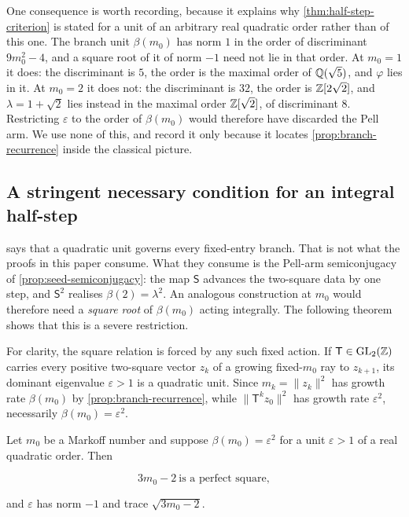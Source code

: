\begin{remark}
One consequence is worth recording, because it explains why
\cref{thm:half-step-criterion} is stated for a unit of an arbitrary real
quadratic order rather than of this one. The branch unit $\beta(m_0)$ has norm
$1$ in the order of discriminant $9m_0^2-4$, and a square root of it of norm
$-1$ need not lie in that order. At $m_0=1$ it does: the discriminant is $5$,
the order is the maximal order of $\mathbb{Q}(\sqrt5)$, and $\varphi$ lies in it. At
$m_0=2$ it does not: the discriminant is $32$, the order is $\mathbb{Z}[2\sqrt2]$, and
$\lambda=1+\sqrt2$ lies instead in the maximal order $\mathbb{Z}[\sqrt2]$, of
discriminant $8$. Restricting $\varepsilon$ to the order of $\beta(m_0)$ would
therefore have discarded the Pell arm. We use none of this, and record it only
because it locates \cref{prop:branch-recurrence} inside the classical
picture.
\end{remark}

\subsection{A stringent necessary condition for an integral half-step}

 says that a quadratic unit governs every
fixed-entry branch. That is not what the proofs in this paper consume. What
they consume is the Pell-arm semiconjugacy of
\cref{prop:seed-semiconjugacy}: the map $\mathsf S$ advances the two-square
data by one step, and $\mathsf S^2$ realises
$\beta(2)=\lambda^2$. An analogous construction at $m_0$ would therefore
need a \emph{square root} of $\beta(m_0)$ acting integrally. The following
theorem shows that this is a severe restriction.

For clarity, the square relation is forced by any such fixed action. If
$\mathsf T\in\mathrm{GL}_2(\mathbb{Z})$ carries every positive two-square vector
$z_k$ of a growing fixed-$m_0$ ray to $z_{k+1}$, its dominant eigenvalue
$\varepsilon>1$ is a quadratic unit. Since
$m_k=\lVert z_k\rVert^2$ has growth rate $\beta(m_0)$ by
\cref{prop:branch-recurrence}, while $\lVert\mathsf T^kz_0\rVert^2$ has
growth rate $\varepsilon^2$, necessarily
$\beta(m_0)=\varepsilon^2$.

\begin{theorem}
\label{thm:half-step-criterion}
Let $m_0$ be a Markoff number and suppose $\beta(m_0)=\varepsilon^2$ for a
unit $\varepsilon>1$ of a real quadratic order. Then

\begin{equation}
 3m_0-2\ \text{is a perfect square},
 \label{eq:half-step-criterion}
\end{equation}

and $\varepsilon$ has norm $-1$ and trace $\sqrt{3m_0-2}$.
\end{theorem}

